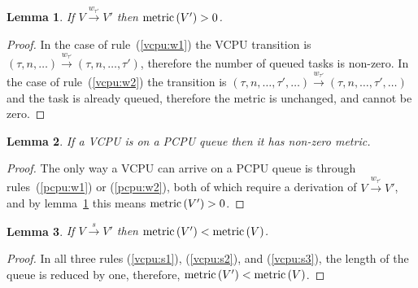 \documentclass[twocolumn,10pt]{article}
\newcommand\paren[1]{\left( {#1} \right)}
\newcommand\sched{\xrightarrow{s}}
\newcommand\wake[1]{\xrightarrow{w_{#1}}}
\newcommand\vcpu[1]{\paren{#1}}
\newtheorem{lma}{Lemma}
\begin{document}
\begin{lma}\label{lma:nonzerometricV}
  If $V\wake{\tau'}V'$ then $\metric {V'}>0$.
\end{lma}
\begin{proof}
  In the case of rule~(\ref{vcpu:w1}) the VCPU transition is
  $\vcpu{\tau,n,\ldots}\wake{\tau'}\vcpu{\tau,n,\ldots,\tau'}$,
  therefore the number of queued tasks is non-zero.  In the case of
  rule~(\ref{vcpu:w2}) the transition is
  $\vcpu{\tau,n,\ldots,\tau',\ldots}\wake{\tau'}\vcpu{\tau,n,\ldots,\tau',\ldots}$
  and the task is already queued, therefore the metric is unchanged,
  and cannot be zero.
\end{proof}

\begin{lma}\label{lma:nonzerometric}
  If a VCPU is on a PCPU queue then it has non-zero metric.
\end{lma}
\begin{proof}
  The only way a VCPU can arrive on a PCPU queue is through
  rules~(\ref{pcpu:w1}) or (\ref{pcpu:w2}), both of which require a
  derivation of $V\wake{\tau'}V'$, and by
  lemma~\ref{lma:nonzerometricV} this means $\metric{V'}>0$.
\end{proof}

\begin{lma}
  \label{lma:indstepV}
  If $V\sched V'$ then $\metric{V'}<\metric{V}$.
\end{lma}
\begin{proof}
  In all three rules (\ref{vcpu:s1}), (\ref{vcpu:s2}), and
  (\ref{vcpu:s3}), the length of the queue is reduced by one,
  therefore, $\metric{V'}<\metric{V}$.
\end{proof}
\end{document}
